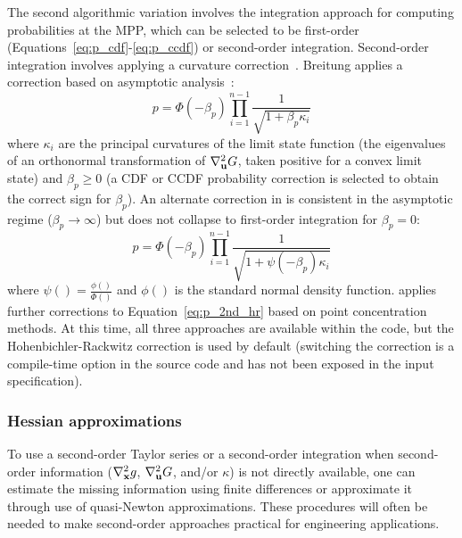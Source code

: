 The second algorithmic variation involves the integration approach for
computing probabilities at the MPP, which can be selected to be
first-order (Equations~\ref{eq:p_cdf}-\ref{eq:p_ccdf}) or second-order
integration.  Second-order integration involves applying a curvature
correction~\cite{Bre84,Hoh88,Hon99}.  Breitung applies a correction
based on asymptotic analysis~\cite{Bre84}:
\begin{equation}
p = \Phi(-\beta_p) \prod_{i=1}^{n-1} \frac{1}{\sqrt{1 + \beta_p \kappa_i}}
\label{eq:p_2nd_breit}
\end{equation}
where $\kappa_i$ are the principal curvatures of the limit state
function (the eigenvalues of an orthonormal transformation of
$\nabla^2_{\bf u} G$, taken positive for a convex limit state) and
$\beta_p \ge 0$ (a CDF or CCDF probability correction is selected to
obtain the correct sign for $\beta_p$).  An alternate correction in
\cite{Hoh88} is consistent in the asymptotic regime ($\beta_p \to \infty$) 
but does not collapse to first-order integration for $\beta_p = 0$:
\begin{equation}
p = \Phi(-\beta_p) \prod_{i=1}^{n-1} 
\frac{1}{\sqrt{1 + \psi(-\beta_p) \kappa_i}} \label{eq:p_2nd_hr}
\end{equation}
where $\psi() = \frac{\phi()}{\Phi()}$ and $\phi()$ is the standard
normal density function.  \cite{Hon99} applies further corrections to
Equation~\ref{eq:p_2nd_hr} based on point concentration methods.  At
this time, all three approaches are available within the code, but the
Hohenbichler-Rackwitz correction is used by default (switching the 
correction is a compile-time option in the source code and has not
been exposed in the input specification).

\subsubsection{Hessian approximations} \label{sec:hessian}

To use a second-order Taylor series or a second-order integration when
second-order information ($\nabla^2_{\bf x} g$, $\nabla^2_{\bf u} G$,
and/or $\kappa$) is not directly available, one can estimate the
missing information using finite differences or approximate it through
use of quasi-Newton approximations.  These procedures will often be
needed to make second-order approaches practical for engineering
applications.

